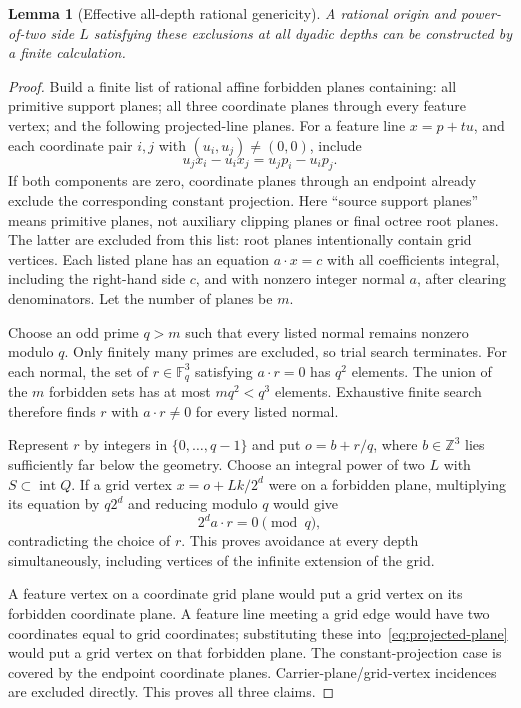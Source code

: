 \documentclass[11pt]{article}
\newtheorem{lemma}[theorem]{Lemma}
\theoremstyle{definition}
\theoremstyle{remark}
\newcommand{\Z}{\mathbb Z}
\newcommand{\Fq}{\mathbb F_q}
\newcommand{\intr}{\operatorname{int}}
\begin{document}
\begin{lemma}[Effective all-depth rational genericity]
\label{lem:grid}
A rational origin and power-of-two side $L$ satisfying these exclusions
at all dyadic depths can be constructed by a finite calculation.
\end{lemma}

\begin{proof}
Build a finite list of rational affine forbidden planes containing:
all primitive support planes; all three coordinate planes through every
feature vertex; and the following projected-line planes. For a feature
line $x=p+tu$, and each coordinate pair $i,j$ with $(u_i,u_j)\ne(0,0)$,
include
\[
  u_jx_i-u_ix_j=u_jp_i-u_ip_j. \tag{5}\label{eq:projected-plane}
\]
If both components are zero, coordinate planes through an endpoint
already exclude the corresponding constant projection. Here ``source
support planes'' means primitive planes, not auxiliary clipping planes
or final octree root planes. The latter are excluded from this list:
root planes intentionally contain grid vertices. Each listed plane has
an equation $a\cdot x=c$ with all coefficients integral, including the
right-hand side $c$, and with nonzero integer normal $a$, after clearing
denominators. Let the number of planes be $m$.

Choose an odd prime $q>m$ such that every listed normal remains nonzero
modulo $q$. Only finitely many primes are excluded, so trial search
terminates. For each normal, the set of $r\in\Fq^3$ satisfying
$a\cdot r=0$ has $q^2$ elements. The union of the $m$ forbidden sets
has at most $mq^2<q^3$ elements. Exhaustive finite search therefore
finds $r$ with $a\cdot r\ne0$ for every listed normal.

Represent $r$ by integers in $\{0,\ldots,q-1\}$ and put
$o=b+r/q$, where $b\in\Z^3$ lies sufficiently far below the geometry.
Choose an integral power of two $L$ with $S\subset\intr Q$. If a grid
vertex $x=o+Lk/2^d$ were on a forbidden plane, multiplying its equation
by $q2^d$ and reducing modulo $q$ would give
\[
  2^d a\cdot r=0\pmod q,
\]
contradicting the choice of $r$. This proves avoidance at every depth
simultaneously, including vertices of the infinite extension of the grid.

A feature vertex on a coordinate grid plane would put a grid vertex
on its forbidden coordinate plane. A feature line meeting a grid edge
would have two coordinates equal to grid coordinates; substituting
these into~\eqref{eq:projected-plane} would put a grid vertex on that
forbidden plane. The constant-projection case is covered by the
endpoint coordinate planes. Carrier-plane/grid-vertex incidences are
excluded directly. This proves all three claims.
\end{proof}
\end{document}
